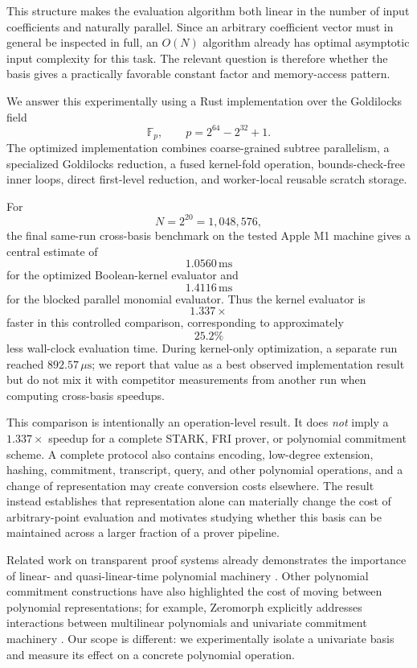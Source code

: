 This structure makes the evaluation algorithm both linear in the number of
input coefficients and naturally parallel. Since an arbitrary coefficient
vector must in general be inspected in full, an \(O(N)\) algorithm already
has optimal asymptotic input complexity for this task. The relevant
question is therefore whether the basis gives a practically favorable
constant factor and memory-access pattern.

We answer this experimentally using a Rust implementation over the
Goldilocks field
\[
\mathbb{F}_p,
\qquad
p=2^{64}-2^{32}+1.
\]
The optimized implementation combines coarse-grained subtree parallelism,
a specialized Goldilocks reduction, a fused kernel-fold operation,
bounds-check-free inner loops, direct first-level reduction, and
worker-local reusable scratch storage.

For
\[
N=2^{20}=1{,}048{,}576,
\]
the final same-run cross-basis benchmark on the tested Apple M1 machine
gives a central estimate of
\[
\boxed{1.0560\,\mathrm{ms}}
\]
for the optimized Boolean-kernel evaluator and
\[
1.4116\,\mathrm{ms}
\]
for the blocked parallel monomial evaluator.  Thus the kernel evaluator is
\[
\boxed{1.337\times}
\]
faster in this controlled comparison, corresponding to approximately
\[
\boxed{25.2\%}
\]
less wall-clock evaluation time.  During kernel-only optimization, a
separate run reached \(892.57\,\mu\mathrm{s}\); we report that value as a
best observed implementation result but do not mix it with competitor
measurements from another run when computing cross-basis speedups.

This comparison is intentionally an operation-level result. It does
\emph{not} imply a \(1.337\times\) speedup for a complete STARK, FRI prover,
or polynomial commitment scheme. A complete protocol also contains
encoding, low-degree extension, hashing, commitment, transcript, query,
and other polynomial operations, and a change of representation may create
conversion costs elsewhere. The result instead establishes that
representation alone can materially change the cost of arbitrary-point
evaluation and motivates studying whether this basis can be maintained
across a larger fraction of a prover pipeline.

Related work on transparent proof systems already demonstrates the
importance of linear- and quasi-linear-time polynomial machinery
\cite{stark2018}. Other polynomial commitment constructions have also
highlighted the cost of moving between polynomial representations; for
example, Zeromorph explicitly addresses interactions between multilinear
polynomials and univariate commitment machinery \cite{zeromorph2023}.
Our scope is different: we experimentally isolate a univariate basis and
measure its effect on a concrete polynomial operation.

